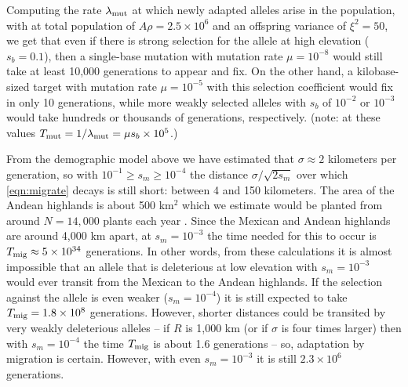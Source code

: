 {{%

Computing the rate $\lambda_{\text{mut}}$ at which newly adapted alleles arise in the population,
with at total population of $A \rho = 2.5 \times 10^6$ and an offspring variance of $\xi^2 = 50$,
we get that even if there is strong selection for the allele at high elevation ($s_b=0.1$),
then a single-base mutation with mutation rate $\mu=10^{-8}$ would still take at least 10,000 generations to appear and fix.
On the other hand, a kilobase-sized target with mutation rate $\mu=10^{-5}$
with this selection coefficient would fix in only 10 generations,
while more weakly selected alleles with $s_b$ of $10^{-2}$ or $10^{-3}$ would take hundreds or thousands of generations, respectively.
(note: at these values $T_{\text{mut}} = 1/\lambda_{\text{mut}} = \mu s_b \times 10^5$.)


From the demographic model above
we have estimated that $\sigma \approx 2$ kilometers per generation,
so with $10^{-1} \ge s_m \ge 10^{-4}$ the distance $\sigma/\sqrt{2s_m}$ over which \eqref{eqn:migrate} decays 
is still short: between 4 and 150 kilometers.
The area of the Andean highlands is about 500 km$^2$ 
which we estimate would be planted from around $N=14,000$ plants each year .
Since the Mexican and Andean highlands are around 4,000 km apart,
at $s_m=10^{-3}$ the time needed for this to occur is $T_{\text{mig}} \approx 5 \times 10^{34}$ generations.
In other words, from these calculations it is almost impossible that an allele that is deleterious at low elevation with $s_m=10^{-3}$ 
would ever transit from the Mexican to the Andean highlands.
If the selection against the allele is even weaker ($s_m=10^{-4}$) it is still expected to take $T_{\text{mig}} = 1.8 \times 10^8$ generations.
However, shorter distances could be transited by very weakly deleterious alleles --
if $R$ is 1,000 km (or if $\sigma$ is four times larger)
then with $s_m=10^{-4}$ the time $T_{\text{mig}}$ is about 1.6 generations --
so, adaptation by migration is certain.
However, with even $s_m=10^{-3}$ it is still $2.3 \times 10^6$ generations.

}}
